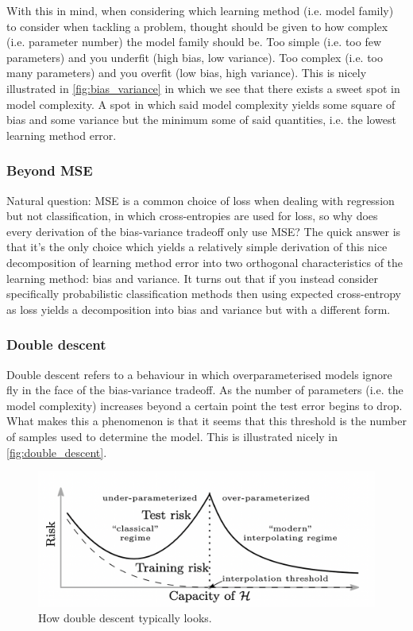 \documentclass[11pt]{article}
\begin{document}
With this in mind, when considering which learning method (i.e. model family) to consider when tackling a problem, thought should be given to how complex (i.e. parameter number) the model family should be. Too simple (i.e. too few parameters) and you underfit (high bias, low variance). Too complex (i.e. too many parameters) and you overfit (low bias, high variance). This is nicely illustrated in \autoref{fig:bias_variance} in which we see that there exists a sweet spot in model complexity. A spot in which said model complexity yields some square of bias and some variance but the minimum some of said quantities, i.e. the lowest learning method error.

\subsubsection{\REV{: }Beyond MSE}
Natural question: MSE is a common choice of loss when dealing with regression but not classification, in which cross-entropies are used for loss, so why does every derivation of the bias-variance tradeoff only use MSE? The quick answer is that it's the only choice which yields a relatively simple derivation of this nice decomposition of learning method error into two orthogonal characteristics of the learning method: bias and variance. It turns out that if you instead consider specifically probabilistic classification methods then using expected cross-entropy as loss yields a decomposition into bias and variance but with a different form.

\subsubsection{\REV{: }Double descent}
Double descent refers to a behaviour in which overparameterised models ignore fly in the face of the bias-variance tradeoff. As the number of parameters (i.e. the model complexity) increases beyond a certain point the test error begins to drop. What makes this a phenomenon is that it seems that this threshold is the number of samples used to determine the model. This is illustrated nicely in \autoref{fig:double_descent}.

\begin{figure}[t]
    \centering
    \includegraphics[width=\columnwidth]{./figures/supervised_learning/double_descent.png}
    \caption{How double descent typically looks. }
    \label{fig:double_descent}
\end{figure}
\end{document}
